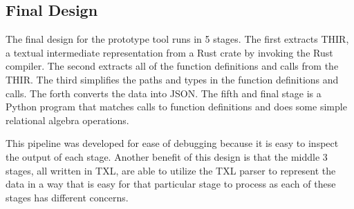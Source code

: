 \documentclass[11pt]{article}
\begin{document}







\subsection{Final Design}

The final design for the prototype tool runs in 5 stages.
The first extracts THIR, a textual intermediate representation from a Rust crate by invoking the Rust compiler.
The second extracts all of the function definitions and calls from the THIR.
The third simplifies the paths and types in the function definitions and calls.
The forth converts the data into JSON.
The fifth and final stage is a Python program that matches calls to function definitions and does some simple relational algebra operations.

This pipeline was developed for ease of debugging because it is easy to inspect the output of each stage.
Another benefit of this design is that the middle 3 stages, all written in TXL, are able to utilize the TXL parser to represent the data in a way that is easy for that particular stage to process as each of these stages has different concerns.
\end{document}
